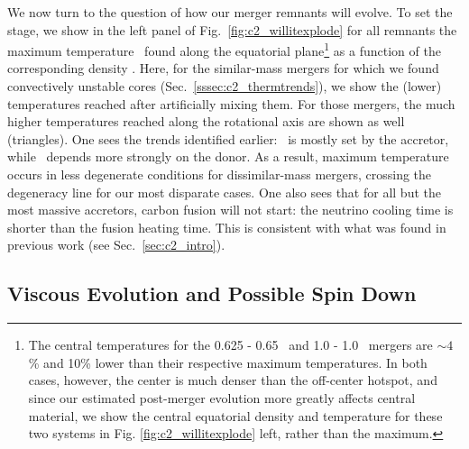 We now turn to the question of how our merger remnants will evolve.  To set the stage, we show in the left panel of Fig.~\ref{fig:c2_willitexplode} for all remnants the maximum temperature \Tmax\ found along the equatorial plane\footnote{The central temperatures for the 0.625 - 0.65 \Msun\ and 1.0 - 1.0 \Msun\ mergers are $\sim\!4$\% and 10\% lower than their respective maximum temperatures.  In both cases, however, the center is much denser than the off-center hotspot, and since our estimated post-merger evolution more greatly affects central material, we show the central equatorial density and temperature for these two systems in Fig. \ref{fig:c2_willitexplode} left, rather than the maximum.} as a function of the corresponding density \rhoTmax.  Here, for the similar-mass mergers for which we found convectively unstable cores (Sec.~\ref{sssec:c2_thermtrends}), we show the (lower) temperatures reached after artificially mixing them.   For those mergers, the much higher temperatures reached along the rotational axis are shown as well (triangles).  One sees the trends identified earlier: \Tmax\ is mostly set by the accretor, while \rhoTmax\ depends more strongly on the donor.  As a result, maximum temperature occurs in less degenerate conditions for dissimilar-mass mergers, crossing the degeneracy line for our most disparate cases.  One also sees that for all but the most massive accretors, carbon fusion will not start: the neutrino cooling time is shorter than the fusion heating time.  This is consistent with what was found in previous work (see Sec.~\ref{sec:c2_intro}).

\subsection{Viscous Evolution and Possible Spin Down}

